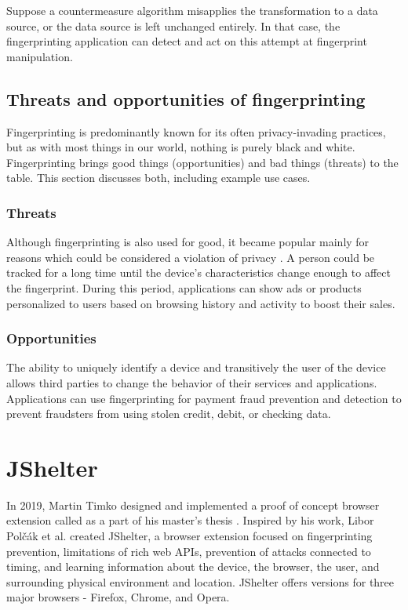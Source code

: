 Suppose a countermeasure algorithm misapplies the transformation to a data source, or the data source is left unchanged entirely. In that case, the fingerprinting application can detect and act on this attempt at fingerprint manipulation.

\section{Threats and opportunities of fingerprinting}
\label{FingerprintingThreatsOpportunities}

Fingerprinting is predominantly known for its often privacy-invading practices, but as with most things in our world, nothing is purely black and white. Fingerprinting brings good things (opportunities) and bad things (threats) to the table. This section discusses both, including example use cases.

\subsection{Threats}

Although fingerprinting is also used for good, it became popular mainly for reasons which could be considered a violation of privacy \cite{WP224Fingerprinting}. A person could be tracked for a long time until the device's characteristics change enough to affect the fingerprint. During this period, applications can show ads or products personalized to users based on browsing history and activity to boost their sales.

\subsection{Opportunities}

The ability to uniquely identify a device and transitively the user of the device allows third parties to change the behavior of their services and applications. Applications can use fingerprinting for payment fraud prevention and detection \cite{FingerprintJSUseCases} to prevent fraudsters from using stolen credit, debit, or checking data.


\chapter{JShelter}
\label{Section:JShelter}

In 2019, Martin Timko designed and implemented a proof of concept browser extension called  as a part of his master's thesis \cite{MatejTimkoDP}. Inspired by his work, Libor Polčák et al. \cite{JShelterPaper} created JShelter, a browser extension focused on fingerprinting prevention, limitations of rich web APIs, prevention of attacks connected to timing, and learning information about the device, the browser, the user, and surrounding physical environment and location. JShelter offers versions for three major browsers - Firefox, Chrome, and Opera.


